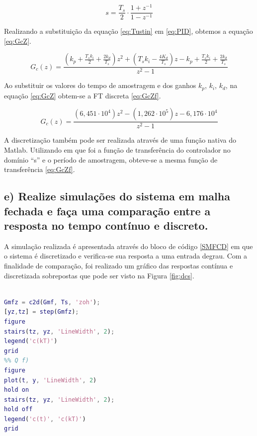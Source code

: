         \begin{equation}
            s = \frac{T_s}{2} \cdot \frac{1+z^{-1}}{1-z^{-1}}
            \label{eq:Tustin}
        \end{equation}

        Realizando a substituição da equação \ref{eq:Tustin} em \ref{eq:PID}, obtemos a equação \ref{eq:GcZ}.
        
        \begin{equation}
            G_c(z) = \frac{(k_p+\frac{T_sk_i}{2}+\frac{2k_d}{T_s})z^2 + (T_sk_i-\frac{4K_d}{T_s})z - k_p + \frac{T_sk_i}{2} + \frac{2k_d}{T_s}}
            {z^2-1}
            \label{eq:GcZ}
        \end{equation}

        Ao substituir os valores do tempo de amostragem e dos ganhos $k_p$, $k_i$, $k_d$, na equação \ref{eq:GcZ} obtem-se a
        FT discreta \ref{eq:GcZf}.

        \begin{equation}
            G_c(z) = \frac{(6,451 \cdot 10^4)z^2 - (1,262 \cdot 10^5)z - 6,176 \cdot 10^4}{z^2-1}
            \label{eq:GcZf}
        \end{equation}
        
        A discretização também pode ser realizada através de uma função  nativa do Matlab. Utilizando 
         em que  foi a função de transferência do controlador no domínio ``s'' e 
        o período de amostragem, obteve-se a mesma função de transferência \ref{eq:GcZf}.



    
    \newpage
    \subsection*{e) Realize simulações do sistema em malha fechada e faça uma comparação entre a resposta no tempo contínuo e discreto.}
        A simulação realizada é apresentada através do bloco de código \ref{SMFCD} em que o sistema é discretizado e verifica-se sua resposta
        a uma entrada degrau. Com a finalidade de comparação, foi realizado um gráfico das respostas contínua e discretizada sobrepostas que 
        pode ser visto na Figura \ref{fig:dcs}.   

        \begin{lstlisting}[language=Matlab,label=SMFCD,caption=Simulações do Sistema em MF e em MA.]

Gmfz = c2d(Gmf, Ts, 'zoh');
[yz,tz] = step(Gmfz);
figure
stairs(tz, yz, 'LineWidth', 2);
legend('c(kT)')
grid
%% Q f)
figure
plot(t, y, 'LineWidth', 2)
hold on
stairs(tz, yz, 'LineWidth', 2);
hold off
legend('c(t)', 'c(kT)')
grid
        \end{lstlisting}


